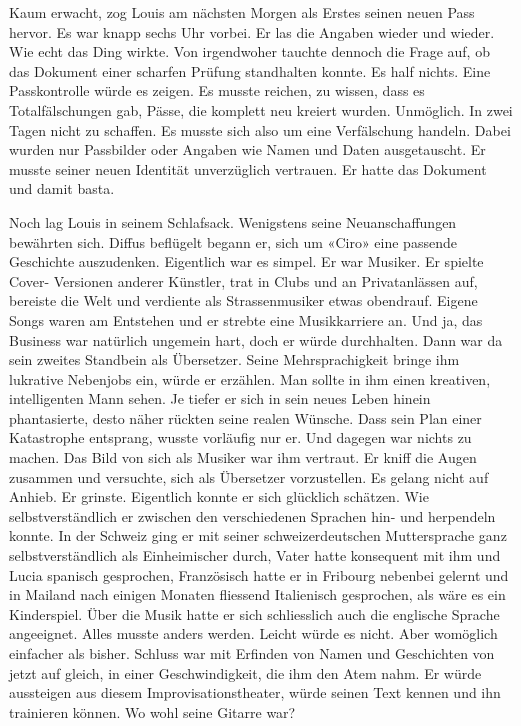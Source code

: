 \sectionbreak

Kaum erwacht, zog Louis am nächsten Morgen als Erstes seinen neuen Pass
hervor. Es war knapp sechs Uhr vorbei. Er las die Angaben wieder und wieder. Wie echt das Ding wirkte.
Von irgendwoher tauchte dennoch die Frage auf, ob das Dokument einer scharfen Prüfung standhalten konnte.
Es half nichts. Eine Passkontrolle würde es zeigen. Es musste reichen,
zu wissen, dass es Totalfälschungen gab, Pässe, die komplett neu kreiert
wurden. Unmöglich. In zwei Tagen nicht zu schaffen.
Es musste sich also um eine Verfälschung handeln. Dabei wurden nur
Passbilder oder Angaben wie Namen und Daten ausgetauscht.
Er musste seiner neuen Identität unverzüglich vertrauen. Er hatte das
Dokument und damit basta.

Noch lag Louis in seinem Schlafsack. Wenigstens seine Neuanschaffungen bewährten sich. Diffus beflügelt begann er, sich um «Ciro» eine passende Geschichte auszudenken. Eigentlich war es simpel. Er war Musiker. Er spielte Cover- Versionen anderer Künstler, trat in Clubs und an Privatanlässen auf, bereiste die Welt und verdiente als Strassenmusiker etwas obendrauf. Eigene Songs waren am Entstehen und er strebte eine Musikkarriere an. Und ja, das Business war natürlich ungemein hart, doch er würde durchhalten. Dann war da sein zweites Standbein als Übersetzer. Seine Mehrsprachigkeit bringe ihm lukrative Nebenjobs ein, würde er erzählen. Man sollte in ihm  einen kreativen, intelligenten Mann sehen.
Je tiefer er sich in sein neues Leben hinein phantasierte, desto näher rückten seine realen Wünsche. Dass sein Plan einer Katastrophe entsprang, wusste vorläufig nur er. Und dagegen war nichts zu machen.
Das Bild von sich als Musiker war ihm vertraut. Er kniff die Augen zusammen und versuchte, sich als Übersetzer vorzustellen. Es gelang nicht auf Anhieb. Er grinste. Eigentlich konnte er sich glücklich schätzen. Wie selbstverständlich er zwischen den verschiedenen Sprachen hin- und herpendeln konnte. In der Schweiz ging er mit seiner schweizerdeutschen Muttersprache ganz selbstverständlich als Einheimischer durch, 
Vater hatte konsequent mit ihm und Lucia spanisch gesprochen, Französisch  
hatte er in Fribourg nebenbei gelernt und in Mailand nach einigen Monaten fliessend Italienisch 
gesprochen, als wäre es ein Kinderspiel. Über die Musik hatte er sich schliesslich auch die englische Sprache angeeignet. 
Alles musste anders werden. Leicht würde es nicht. Aber womöglich
einfacher als bisher. Schluss war mit Erfinden von Namen und Geschichten
von jetzt auf gleich, in einer Geschwindigkeit, die ihm den Atem nahm.
Er würde aussteigen aus diesem Improvisationstheater, würde seinen Text
kennen und ihn trainieren können. Wo wohl seine Gitarre war?

